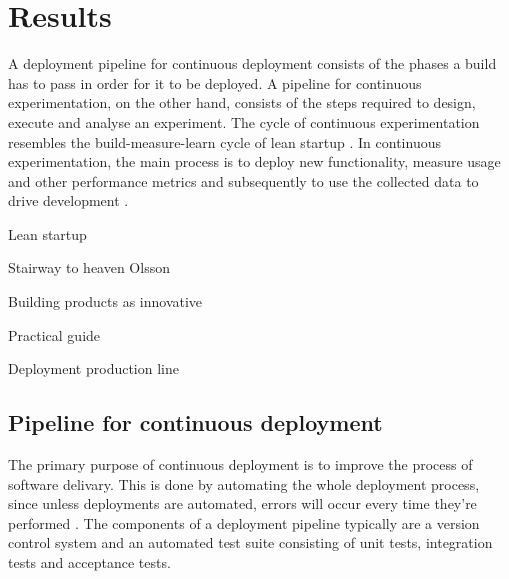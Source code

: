 \documentclass[conference]{IEEEtran}
\begin{document}
\section{Results} %

A deployment pipeline for continuous deployment consists of the phases a build has to pass in order for it to be deployed. A pipeline for continuous experimentation, on the other hand, consists of the steps required to design, execute and analyse an experiment. The cycle of continuous experimentation resembles the build-measure-learn cycle of lean startup \cite{ries2011lean}. In continuous experimentation, the main process is to deploy new functionality, measure usage and other performance metrics and subsequently to use the collected data to drive development \cite{bosch2012building}.

Lean startup \cite{ries2011lean} %

Stairway to heaven Olsson \cite{olsson2012climbing}

Building products as innovative \cite{bosch2012building}

Practical guide \cite{kohavi2007practical}

Deployment production line \cite{humble2006deployment}

\subsection{Pipeline for continuous deployment}	

The primary purpose of continuous deployment is to improve the process of software delivary. This is done by automating the whole deployment process, since unless deployments are automated, errors will occur every time they're performed \cite{cdbook}. The components of a deployment pipeline typically are a version control system and an automated test suite consisting of unit tests, integration tests and acceptance tests. 
\end{document}
